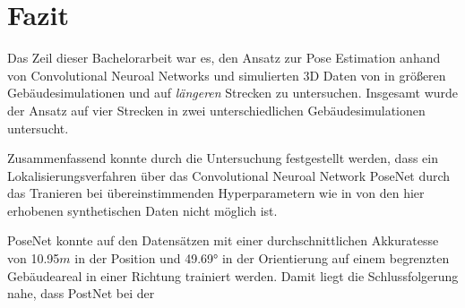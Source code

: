 
\section{Fazit}
\label{sec:kapitel_6}
Das Zeil dieser Bachelorarbeit war es, den Ansatz zur Pose Estimation anhand von Convolutional Neuroal Networks und simulierten 3D Daten von \citet{acharyaBIMPoseNetIndoorCamera2019} in größeren Gebäudesimulationen und auf \textit{längeren} Strecken zu untersuchen.
Insgesamt wurde der Ansatz auf vier Strecken in zwei unterschiedlichen Gebäudesimulationen untersucht. 

Zusammenfassend konnte durch die Untersuchung festgestellt werden, dass ein Lokalisierungsverfahren über das Convolutional Neuroal Network PoseNet durch das Tranieren bei übereinstimmenden Hyperparametern wie in \cite{acharyaBIMPoseNetIndoorCamera2019} von den hier erhobenen synthetischen Daten nicht möglich ist. 

PoseNet konnte auf den Datensätzen mit einer durchschnittlichen Akkuratesse von 10.95$m$ in der Position und 49.69° in der Orientierung auf einem begrenzten Gebäudeareal in einer Richtung trainiert werden. Damit liegt die Schlussfolgerung nahe, dass PostNet bei der 

